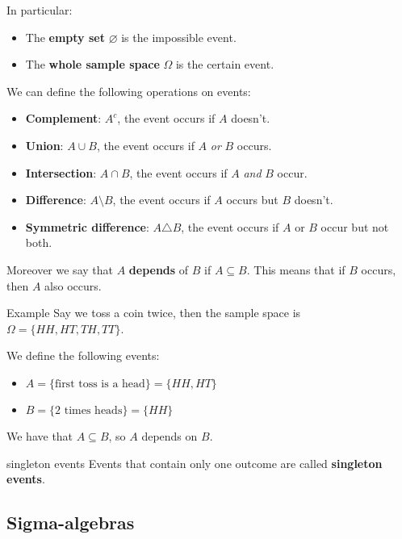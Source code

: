 \documentclass[10pt]{extarticle}
\begin{document}
In particular:
\begin{itemize}
    \item The \textbf{empty set} $\varnothing$ is the impossible event.
    \item The \textbf{whole sample space} $\Omega$ is the certain event.
\end{itemize}

We can define the following operations on events:
\begin{itemize}
    \item \textbf{Complement}: $A^c$, the event occurs if $A$ doesn't.
    \item \textbf{Union}: $A \cup B$, the event occurs if $A$ \textit{or} $B$ occurs.
    \item \textbf{Intersection}: $A \cap B$, the event occurs if $A$ \textit{and} $B$ occur.
    \item \textbf{Difference}: $A \setminus B$, the event occurs if $A$ occurs but $B$ doesn't.
    \item \textbf{Symmetric difference}: $A \triangle B$, the event occurs if $A$ or $B$ occur but not both.
\end{itemize}

Moreover we say that $A$ \textbf{depends} of $B$ if $A \subseteq B$. This means that if $B$ occurs, then $A$ also occurs.

\begin{examplebox}{Example}
    Say we toss a coin twice, then the sample space is $\Omega = \{HH, HT, TH, TT\}$.

    We define the following events:
    \begin{itemize}
        \item $A = \{\text{first toss is a head}\} = \{HH, HT\}$
        \item $B = \{\text{2 times heads}\} = \{HH\}$
    \end{itemize}

    We have that $A \subseteq B$, so $A$ depends on $B$.
\end{examplebox}

\begin{notebox}{singleton events}
    Events that contain only one outcome are called \textbf{singleton events}.
\end{notebox}

\subsection{Sigma-algebras}
\end{document}
